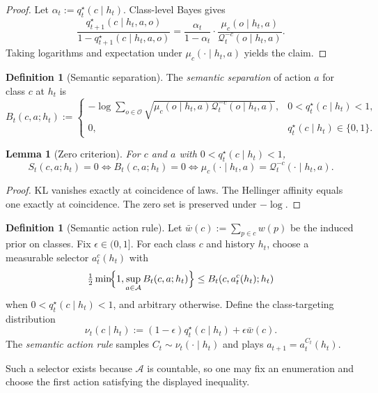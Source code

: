 \documentclass[11pt]{article}
\newtheorem{lemma}[theorem]{Lemma}
\theoremstyle{definition}
\newtheorem{definition}[theorem]{Definition}
\theoremstyle{remark}
\newcommand{\Acal}{\mathcal{A}}
\newcommand{\Ocal}{\mathcal{O}}
\newcommand{\Qcal}{\mathcal{Q}}
\begin{document}
\begin{proof}
Let $\alpha_t:=q_t^\star(c\mid h_t)$. Class-level Bayes gives
\[
\frac{q_{t+1}^\star(c\mid h_t,a,o)}{1-q_{t+1}^\star(c\mid h_t,a,o)}
=
\frac{\alpha_t}{1-\alpha_t}\cdot\frac{\mu_c(o\mid h_t,a)}{\Qcal_t^{-c}(o\mid h_t,a)}.
\]
Taking logarithms and expectation under $\mu_c(\cdot\mid h_t,a)$ yields the claim.
\end{proof}

\begin{definition}[Semantic separation]
\label{def:semantic-separation}
The \emph{semantic separation} of action $a$ for class $c$ at $h_t$ is
\[
B_t(c,a;h_t)
:=
\begin{cases}
-\log\sum_{o\in\Ocal}\sqrt{\mu_c(o\mid h_t,a)\Qcal_t^{-c}(o\mid h_t,a)}, & 0<q_t^\star(c\mid h_t)<1,\\
0, & q_t^\star(c\mid h_t)\in\{0,1\}.
\end{cases}
\]
\end{definition}

\begin{lemma}[Zero criterion]
\label{lem:zero-criterion}
For $c$ and $a$ with $0<q_t^\star(c\mid h_t)<1$,
\[
S_t(c,a;h_t)=0
\iff
B_t(c,a;h_t)=0
\iff
\mu_c(\cdot\mid h_t,a)=\Qcal_t^{-c}(\cdot\mid h_t,a).
\]
\end{lemma}

\begin{proof}
KL vanishes exactly at coincidence of laws. The Hellinger affinity equals one exactly at coincidence. The zero set is preserved under $-\log$.
\end{proof}

\begin{definition}[Semantic action rule]
\label{def:semantic-rule}
Let $\bar w(c):=\sum_{p\in c}w(p)$ be the induced prior on classes. Fix $\epsilon\in(0,1]$. For each class $c$ and history $h_t$, choose a measurable selector $a_t^c(h_t)$ with
\[
\tfrac{1}{2}\min\!\Bigl\{1,\sup_{a\in\Acal}B_t(c,a;h_t)\Bigr\}
\le
B_t(c,a_t^c(h_t);h_t)
\]
when $0<q_t^\star(c\mid h_t)<1$, and arbitrary otherwise. Define the class-targeting distribution
\[
\nu_t(c\mid h_t):=(1-\epsilon)q_t^\star(c\mid h_t)+\epsilon\bar w(c).
\]
The \emph{semantic action rule} samples $C_t\sim\nu_t(\cdot\mid h_t)$ and plays $a_{t+1}=a_t^{C_t}(h_t)$.
\end{definition}

Such a selector exists because $\Acal$ is countable, so one may fix an enumeration and choose the first action satisfying the displayed inequality.
\end{document}
